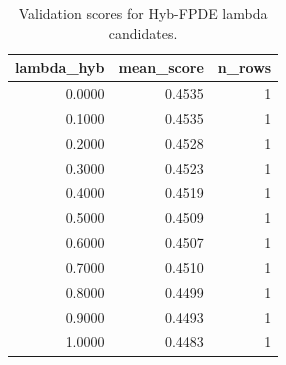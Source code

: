 \begin{table}[t]
\caption{Validation scores for Hyb-FPDE lambda candidates.}
\label{tab:lambda_distribution_computed}
\centering
\begin{tabular}{rrr}
\toprule
lambda\_hyb & mean\_score & n\_rows \\
\midrule
0.0000 & 0.4535 & 1 \\
0.1000 & 0.4535 & 1 \\
0.2000 & 0.4528 & 1 \\
0.3000 & 0.4523 & 1 \\
0.4000 & 0.4519 & 1 \\
0.5000 & 0.4509 & 1 \\
0.6000 & 0.4507 & 1 \\
0.7000 & 0.4510 & 1 \\
0.8000 & 0.4499 & 1 \\
0.9000 & 0.4493 & 1 \\
1.0000 & 0.4483 & 1 \\
\bottomrule
\end{tabular}

\end{table}
